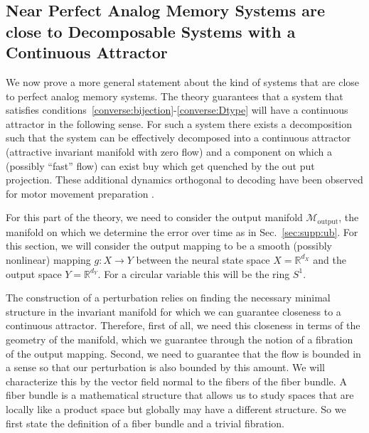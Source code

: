 \documentclass{article} %
\newcounter{ct}
\newcommand{\reals}{\mathbb{R}}
\newcommand{\manifold}{\mathcal{M}}
\theoremstyle{definition}
\theoremstyle{remark}
\begin{document}
\subsection{Near Perfect Analog Memory Systems are close to Decomposable Systems with a Continuous Attractor}\label{sec:near_ca}

We now prove a more general statement about the kind of systems that are close to perfect analog memory systems.
The theory guarantees that a system that satisfies conditions~\ref{converse:bijection}-\ref{converse:Dtype}  will have a continuous attractor in the following sense.
For such a system there exists a decomposition such that the system can be effectively decomposed into a continuous attractor (attractive invariant manifold with zero flow) and a component on which a (possibly ``fast'' flow) can exist buy which get quenched by the out put projection.
These additional dynamics orthogonal to decoding have been observed for motor movement preparation \citep{kaufman2014null, churchland2024preparatory}.

For this part of the theory, we need to consider the output manifold \(\manifold_{\text{output}}\), the manifold on which we determine the error over time as in Sec.~\ref{sec:supp:ub}.
For this section, we will consider the output mapping to be a smooth (possibly nonlinear) mapping \(g\colon X\rightarrow Y\) between the neural state space \(X=\reals^{d_{X}}\) and the output space \(Y=\reals^{d_{Y}}\).
For a circular variable this will be the ring \(S^{1}\).

The construction of a perturbation relies on finding the necessary minimal structure in the invariant manifold for which we can guarantee closeness to a continuous attractor.
Therefore, first of all, we need this closeness in terms of the geometry of the manifold, which we guarantee through the notion of a fibration of the output mapping.
Second, we need to guarantee that the flow is bounded in a sense so that our perturbation is also bounded by this amount.
We will characterize this by the vector field normal to the fibers of the fiber bundle.
A fiber bundle is a mathematical structure that allows us to study spaces that are locally like a product space but globally may have a different structure.
So we first state the definition of a fiber bundle and a trivial fibration.
\end{document}
